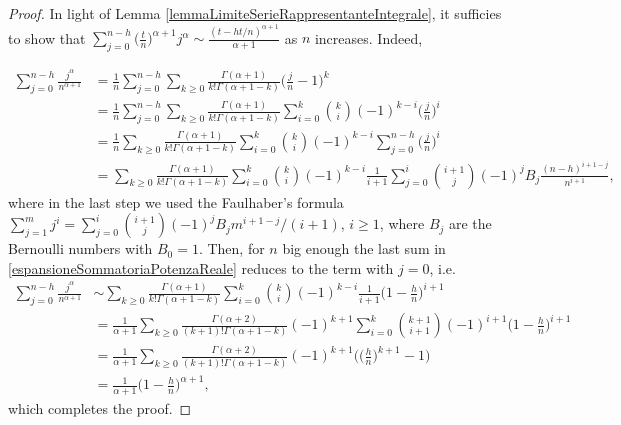 \documentclass[12pt, twoside, english, headsepline]{article}
\theoremstyle{definition} %
\numberwithin{equation}{section} %
\begin{document}
\begin{proof}
In light of Lemma \ref{lemmaLimiteSerieRappresentanteIntegrale}, it sufficies to show that $ \sum_{j = 0}^{n-h} \big(\frac{t}{n}\big)^{\alpha+1} j^\alpha \sim \frac{(t-ht/n)^{\alpha+1}}{\alpha+1}$ as $n$ increases. Indeed,

\begin{align}
	\sum_{j=0}^{n-h} \frac{j^\alpha}{n^{\alpha+1}}  & = \frac{1}{n}\sum_{j=0}^{n-h}\sum_{k\ge0} \frac{\Gamma(\alpha+1)}{k!\Gamma(\alpha+1-k)}  \Big(\frac{j}{n}-1\Big)^k \nonumber \\
	&= \frac{1}{n}\sum_{j=0}^{n-h}\sum_{k\ge0} \frac{\Gamma(\alpha+1)}{k!\Gamma(\alpha+1-k)}  \sum_{i=0}^k \binom{k}{i} (-1)^{k-i} \Big(\frac{j}{n}\Big)^i \nonumber\\ %
	& = \frac{1}{n}\sum_{k\ge0} \frac{\Gamma(\alpha+1)}{k!\Gamma(\alpha+1-k)}  \sum_{i=0}^k \binom{k}{i} (-1)^{k-i} \sum_{j=0}^{n-h}\Big(\frac{j}{n}\Big)^i \nonumber\\
	&= \sum_{k\ge0} \frac{\Gamma(\alpha+1)}{k!\Gamma(\alpha+1-k)}  \sum_{i=0}^k \binom{k}{i} (-1)^{k-i} \frac{1}{i+1}\sum_{j=0}^i \binom{i+1}{j} (-1)^j B_j \frac{(n-h)^{i+1-j}}{n^{i+1}}, \label{espansioneSommatoriaPotenzaReale} %
\end{align}
where in the last step we used the Faulhaber's formula $\sum_{j=1}^m j^i = \sum_{j=0}^i \binom{i+1}{j} (-1)^j B_j m^{i+1-j} / (i+1)$, $i\ge1$, where $B_j$ are the Bernoulli numbers with $B_0 = 1$. Then, for $n$ big enough the last sum in \eqref{espansioneSommatoriaPotenzaReale} reduces to the term with $j=0$, i.e.
\begin{align}
	\sum_{j=0}^{n-h} \frac{j^\alpha}{n^{\alpha+1}}  & \sim \sum_{k\ge0} \frac{\Gamma(\alpha+1)}{k!\Gamma(\alpha+1-k)}  \sum_{i=0}^k \binom{k}{i} (-1)^{k-i} \frac{1}{i+1} \bigg(1-\frac{h}{n}\bigg)^{i+1}  \nonumber\\
	& = \frac{1}{\alpha+1}\sum_{k\ge0} \frac{\Gamma(\alpha+2)}{(k+1)!\Gamma(\alpha+1-k)} (-1)^{k+1} \sum_{i=0}^k \binom{k+1}{i+1} (-1)^{i+1} \bigg(1-\frac{h}{n}\bigg)^{i+1}  \nonumber\\
	& =  \frac{1}{\alpha+1}\sum_{k\ge0} \frac{\Gamma(\alpha+2)}{(k+1)!\Gamma(\alpha+1-k)} (-1)^{k+1} \Bigg( \bigg(\frac{h}{n}\bigg)^{k+1}- 1\Bigg) \nonumber\\
	& = \frac{1}{\alpha+1} \bigg(1-\frac{h}{n}\bigg)^{\alpha +1},\nonumber
\end{align}
which completes the proof.
\end{proof}
\end{document}
